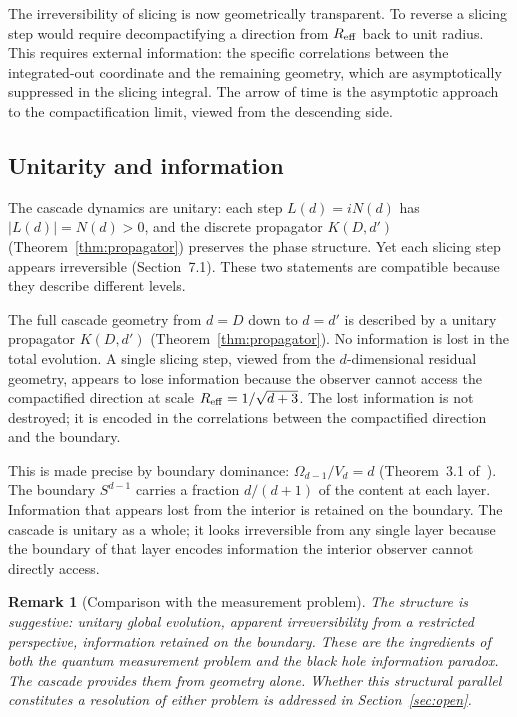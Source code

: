 \documentclass[12pt,a4paper]{article}
\newtheorem{remark}[theorem]{Remark}
\begin{document}
The irreversibility of slicing is now geometrically transparent. To reverse a slicing step
would require decompactifying a direction from $R_{\rm eff}$ back to unit radius. This
requires external information: the specific correlations between the integrated-out
coordinate and the remaining geometry, which are asymptotically suppressed in the slicing
integral. The arrow of time is the asymptotic approach to the compactification limit,
viewed from the descending side.

\subsection{Unitarity and information}

The cascade dynamics are unitary: each step $L(d) = iN(d)$ has $|L(d)| = N(d) > 0$, and
the discrete propagator $K(D,d')$ (Theorem~\ref{thm:propagator}) preserves the phase
structure. Yet each slicing step appears irreversible (Section~7.1). These two statements
are compatible because they describe different levels.

The full cascade geometry from $d=D$ down to $d=d'$ is described by a unitary propagator
$K(D,d')$ (Theorem~\ref{thm:propagator}). No information is lost in the total evolution.
A single slicing step, viewed from the $d$-dimensional residual geometry, appears to lose
information because the observer cannot access the compactified direction at scale
$R_{\rm eff}=1/\sqrt{d+3}$. The lost information is not destroyed; it is encoded in the
correlations between the compactified direction and the boundary.

This is made precise by boundary dominance: $\Omega_{d-1}/V_d=d$ (Theorem~3.1
of~\cite{part0}). The boundary $S^{d-1}$ carries a fraction $d/(d+1)$ of the content at
each layer. Information that appears lost from the interior is retained on the boundary.
The cascade is unitary as a whole; it looks irreversible from any single layer because the
boundary of that layer encodes information the interior observer cannot directly access.

\begin{remark}[Comparison with the measurement problem]
The structure is suggestive: unitary global evolution, apparent irreversibility from a
restricted perspective, information retained on the boundary. These are the ingredients of
both the quantum measurement problem and the black hole information paradox. The cascade
provides them from geometry alone. Whether this structural parallel constitutes a resolution
of either problem is addressed in Section~\ref{sec:open}.
\end{remark}
\end{document}
